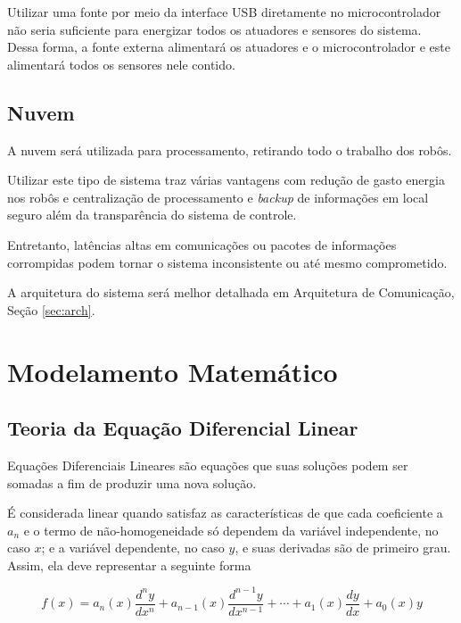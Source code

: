 \documentclass[portugues, brazil, a4paper,12pt]{article}
\begin{document}
		Utilizar uma fonte por meio da interface USB diretamente no microcontrolador não seria suficiente para energizar todos os atuadores e sensores do sistema. Dessa forma, a fonte externa alimentará os atuadores e o microcontrolador e este alimentará todos os sensores nele contido.




	\subsection{Nuvem}
		A nuvem será utilizada para processamento, retirando todo o trabalho dos robôs.

		Utilizar este tipo de sistema traz várias vantagens com redução de gasto energia nos robôs e centralização de processamento e \textit{backup} de informações em local seguro além da transparência do sistema de controle.

		Entretanto, latências altas em comunicações ou pacotes de informações corrompidas podem tornar o sistema inconsistente ou até mesmo comprometido.

		A arquitetura do sistema será melhor detalhada em Arquitetura de Comunicação, Seção \ref{sec:arch}.


\section{Modelamento Matemático} \label{sec:math}

	\subsection{Teoria da Equação Diferencial Linear}
		Equações Diferenciais Lineares são equações que suas soluções podem ser somadas a fim de produzir uma nova solução.

		É considerada linear quando satisfaz as características de que cada coeficiente a $a_{n}$ e o termo de não-homogeneidade só dependem da variável independente, no caso $x$; e a variável dependente, no caso $y$, e suas derivadas são de primeiro grau. Assim, ela deve representar a seguinte forma

		\begin{equation}
		f(x) = a_{n}(x)\frac{d^{n}y}{dx^{n}} + a_{n-1}(x)\frac{d^{n-1}y}{dx^{n-1}} + \cdots +  a_{1}(x)\frac{dy}{dx} + a_0(x)y
		\end{equation}

\end{document}
